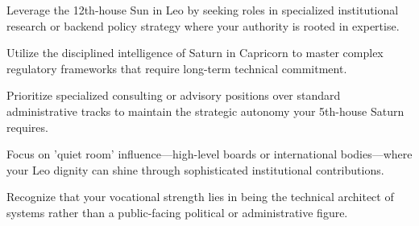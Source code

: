 \begin{diamondlist}
  \item {\fontsize{8.5}{12}\selectfont Leverage the 12th-house Sun in Leo by seeking roles in specialized institutional research or backend policy strategy where your authority is rooted in expertise.}
  \item {\fontsize{8.5}{12}\selectfont Utilize the disciplined intelligence of Saturn in Capricorn to master complex regulatory frameworks that require long-term technical commitment.}
  \item {\fontsize{8.5}{12}\selectfont Prioritize specialized consulting or advisory positions over standard administrative tracks to maintain the strategic autonomy your 5th-house Saturn requires.}
  \item {\fontsize{8.5}{12}\selectfont Focus on 'quiet room' influence---high-level boards or international bodies---where your Leo dignity can shine through sophisticated institutional contributions.}
  \item {\fontsize{8.5}{12}\selectfont Recognize that your vocational strength lies in being the technical architect of systems rather than a public-facing political or administrative figure.}
\end{diamondlist}



